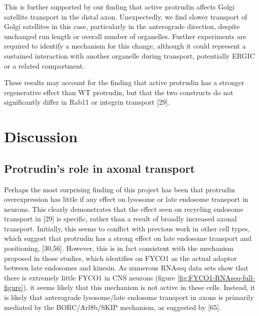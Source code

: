 \documentclass[
  12pt,
  a4paper,
]{book}
\begin{document}
This is further supported by our finding that active protrudin affects Golgi satellite transport in the distal axon. Unexpectedly, we find slower transport of Golgi satellites in this case, particularly in the anterograde direction, despite unchanged run length or overall number of organelles. Further experiments are required to identify a mechanism for this change, although it could represent a sustained interaction with another organelle during transport, potentially ERGIC or a related compartment.

These results may account for the finding that active protrudin has a stronger regenerative effect than WT protrudin, but that the two constructs do not significantly differ in Rab11 or integrin transport {[}29{]}.

\hypertarget{DISCUSSION}{%
\chapter*{Discussion}\label{DISCUSSION}}


\hypertarget{protrudins-role-in-axonal-transport}{%
\section{Protrudin's role in axonal transport}\label{protrudins-role-in-axonal-transport}}

Perhaps the most surprising finding of this project has been that protrudin overexpression has little if any effect on lysosome or late endosome transport in neurons. This clearly demonstrates that the effect seen on recycling endosome transport in {[}29{]} is specific, rather than a result of broadly increased axonal transport. Initially, this seems to conflict with previous work in other cell types, which suggest that protrudin has a strong effect on late endosome transport and positioning, {[}30,56{]}. However, this is in fact consistent with the mechanism proposed in those studies, which identifies on FYCO1 as the actual adaptor between late endosomes and kinesin. As numerous RNAseq data sets show that there is extremely little FYCO1 in CNS neurons (figure \ref{fig:FYCO1-RNAseq-full-figure}), it seems likely that this mechanism is not active in these cells. Instead, it is likely that anterograde lysosome/late endosome transport in axons is primarily mediated by the BORC/Arl8b/SKIP mechanism, as suggested by {[}65{]}.
\end{document}
